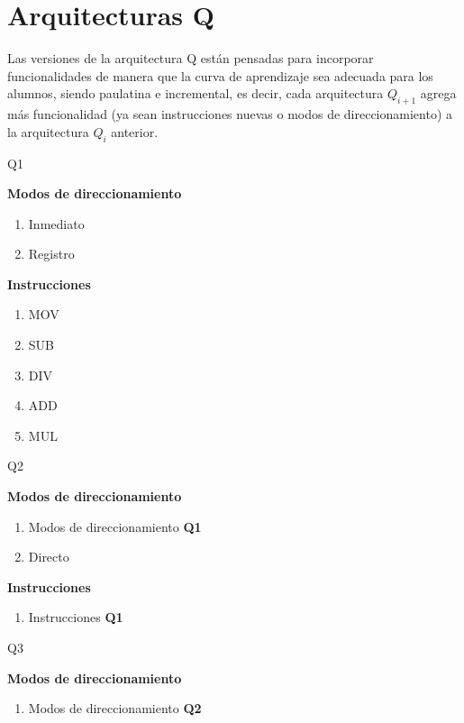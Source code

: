 \section{Arquitecturas Q}

Las versiones de la arquitectura Q están pensadas para incorporar funcionalidades de manera que la curva de aprendizaje sea adecuada para los alumnos, siendo paulatina e incremental, es decir, cada arquitectura $Q_{i+1}$ agrega más funcionalidad (ya sean instrucciones nuevas o modos de direccionamiento) a la arquitectura  $Q_{i}$ anterior.


{Q1}


\textbf{Modos de direccionamiento}
\begin{enumerate}
\item Inmediato
\item Registro
\end{enumerate}

\textbf{Instrucciones}
\begin{enumerate}
\item MOV
\item SUB 
\item DIV 
\item ADD 
\item MUL
\end{enumerate}


{Q2}

\textbf{Modos de direccionamiento}
\begin{enumerate}
\item Modos de direccionamiento \textbf{Q1}
\item Directo 
\end{enumerate}

\textbf{Instrucciones}
\begin{enumerate}
\item Instrucciones \textbf{Q1}
\end{enumerate}

{Q3}

\textbf{Modos de direccionamiento}
\begin{enumerate}
\item Modos de direccionamiento \textbf{Q2}
\end{enumerate}

